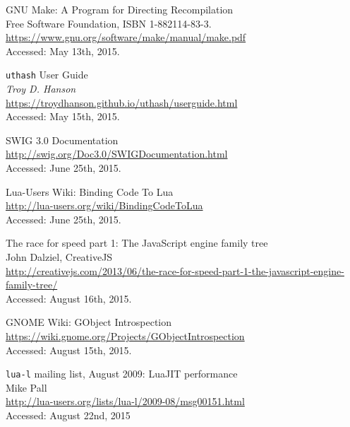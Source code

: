 \begin{thebibliography}{99}
		GNU Make: A Program for Directing Recompilation \\
		Free Software Foundation, ISBN 1-882114-83-3. \\
		\url{https://www.gnu.org/software/make/manual/make.pdf} \\
		Accessed: May 13th, 2015.

		\verb|uthash| User Guide \\
		\emph{Troy D. Hanson} \\
		\url{https://troydhanson.github.io/uthash/userguide.html} \\
		Accessed: May 15th, 2015.

		SWIG 3.0 Documentation \\
		\url{http://swig.org/Doc3.0/SWIGDocumentation.html} \\
		Accessed: June 25th, 2015.

		Lua-Users Wiki: Binding Code To Lua \\
		\url{http://lua-users.org/wiki/BindingCodeToLua} \\
		Accessed: June 25th, 2015.

		The race for speed part 1: The JavaScript engine family tree \\
		John Dalziel, CreativeJS \\
		\url{http://creativejs.com/2013/06/the-race-for-speed-part-1-the-javascript-engine-family-tree/} \\
		Accessed: August 16th, 2015.

		GNOME Wiki: GObject Introspection \\
		\url{https://wiki.gnome.org/Projects/GObjectIntrospection} \\
		Accessed: August 15th, 2015.

		\verb|lua-l| mailing list, August 2009: LuaJIT performance \\
		Mike Pall \\
		\url{http://lua-users.org/lists/lua-l/2009-08/msg00151.html} \\
		Accessed: August 22nd, 2015

\end{thebibliography}

